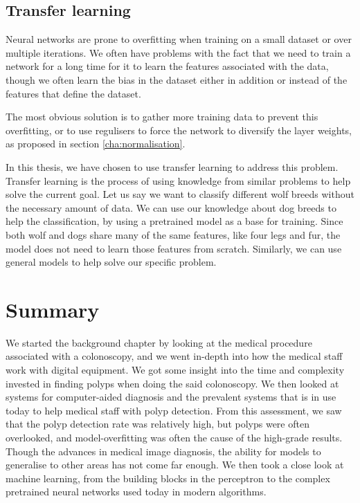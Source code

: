 
    
\subsection{Transfer learning}
Neural networks are prone to overfitting when training on a small dataset or over multiple iterations. We often have problems with the fact that we need to train a network for a long time for it to learn the features associated with the data, though we often learn the bias in the dataset either in addition or instead of the features that define the dataset.

The most obvious solution is to gather more training data to prevent this overfitting, or to use regulisers to force the network to diversify the layer weights, as proposed in section \ref{cha:normalisation}.

In this thesis, we have chosen to use transfer learning to address this problem. Transfer learning is the process of using knowledge from similar problems to help solve the current goal.  Let us say we want to classify different wolf breeds without the necessary amount of data. We can use our knowledge about dog breeds to help the classification, by using a pretrained model as a base for training. Since both wolf and dogs share many of the same features, like four legs and fur, the model does not need to learn those features from scratch.
Similarly, we can use general models to help solve our specific problem.



     
   
\section{Summary}
We started the background chapter by looking at the medical procedure associated with a colonoscopy, and we went in-depth into how the medical staff work with digital equipment. We got some insight into the time and complexity invested in finding polyps when doing the said colonoscopy.
We then looked at systems for computer-aided diagnosis and the prevalent systems that is in use today to help medical staff with polyp detection. 
From this assessment, we saw that the polyp detection rate was relatively high, but polyps were often overlooked, and model-overfitting was often the cause of the high-grade results. Though the advances in medical image diagnosis, the ability for models to generalise to other areas has not come far enough.
We then took a close look at machine learning, from the building blocks in the perceptron to the complex pretrained neural networks used today in modern algorithms. 

